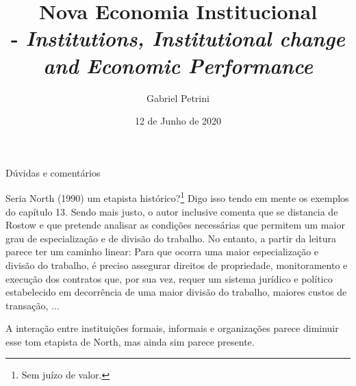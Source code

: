 \documentclass[11pt,lineno]{../style}
\title{
\large{Nova Economia Institucional}\vspace{2pt}\\
\Huge{\autor - \textit{Institutions, Institutional change and Economic Performance}}
}
\date{12 de Junho de 2020}
\author[$\ast$]{Gabriel Petrini}
\affil[$\ast$]{PhD Student at Unicamp.}
\newcommand{\autor}{North (1990) }
\begin{document}
\maketitle
\marginmark
\thispagestyle{firststyle}





	
\begin{redbox}{Dúvidas e comentários}
	
Seria	\autor 	um etapista histórico?\footnote{Sem juízo de valor.} Digo isso tendo em mente os exemplos do capítulo 13. Sendo mais justo, o autor inclusive comenta que se distancia de Rostow e que pretende analisar as condições necessárias que permitem um maior grau de especialização e de divisão do trabalho. No entanto, a partir da leitura parece ter um caminho linear: Para que ocorra uma maior especialização e divisão do trabalho, é preciso assegurar direitos de propriedade, monitoramento e execução dos contratos que, por sua vez, requer um sistema jurídico e político estabelecido em decorrência de uma maior divisão do trabalho, maiores custos de transação, $\ldots$

A interação entre instituições formais, informais e organizações parece diminuir esse tom etapista de North, mas ainda sim parece presente.
\end{redbox}
\end{document}
